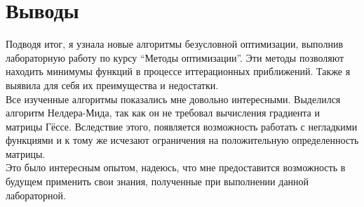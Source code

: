 \section{Выводы}
Подводя итог, я узнала новые алгоритмы безусловной оптимизации, выполнив лабораторную работу по курсу \enquote{Методы оптимизации}. Эти методы позволяют находить минимумы функций в процессе иттерационных приближений. Также я выявила для себя их преимущества и недостатки. \\

Все изученные алгоритмы показались мне довольно интересными. Выделился алгоритм  Нелдера-Мида, так как он не требовал вычисления градиента и матрицы Гёссе. Вследствие этого, появляется возможность работать с негладкими функциями и к тому же исчезают ограничения на положительную определенность матрицы.\\

Это было интересным опытом, надеюсь, что мне предоставится возможность в будущем применить свои знания, полученные при выполнении данной лабораторной.

\pagebreak
